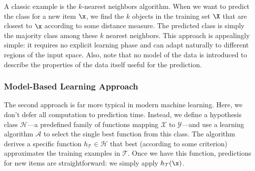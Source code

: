 \begin{center}
\end{center}

A classic example is the \alert{$k$-nearest neighbors} algorithm. When we want to predict the class for a new item $\x$, we find the $k$ objects in the training set $\X$ that are closest to $\x$ according to some distance measure. The predicted class is simply the majority class among these $k$ nearest neighbors. This approach is appealingly simple: it requires no explicit learning phase and can adapt naturally to different regions of the input space. Also, note that no model of the data is introduced to describe the properties of the data itself useful for the prediction.

\subsubsection*{Model-Based Learning Approach}

The second approach is far more typical in modern machine learning. Here, we don't defer all computation to prediction time. Instead, we define a \alert{hypothesis class} $\mathcal{H}$---a predefined family of functions mapping $\mathcal{X}$ to $\mathcal{Y}$---and use a learning algorithm $\mathcal{A}$ to select the single best function from this class. The algorithm derives a specific function $h_{\mathcal{T}} \in \mathcal{H}$ that best (according to some criterion) approximates the training examples in $\mathcal{T}$. Once we have this function, predictions for new items are straightforward: we simply apply $h_{\mathcal{T}}(\x)$.

